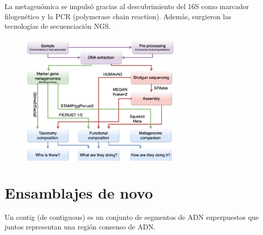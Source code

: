 La metagenómica se impulsó gracias al descubrimiento del 16S como marcador filogenético y la PCR (polymerase chain reaction). Además, surgieron las tecnologías de secuenciación NGS. 

\begin{figure}[h]
\centering
\includegraphics[width = 0.7\textwidth]{figs/metagenomics-flow.png}
\end{figure}

\section{Ensamblajes de novo}
Un contig (de contiguous) es un conjunto de segmentos de ADN superpuestos que juntos representan una región consenso de ADN.

